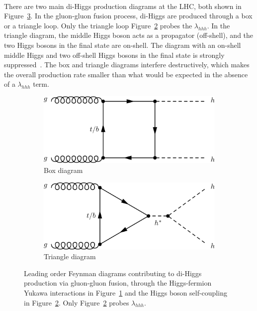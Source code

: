 \paragraph{}
There are two main di-Higgs production diagrams at the LHC, both shown in Figure~\ref{fig:SM_HH}. In the gluon-gluon  fusion process, di-Higgs are produced through a box or a triangle loop. 
Only the triangle loop Figure~\ref{fig:SM_HH_tri} probes the $\lambda_{hhh}$. 
In the triangle diagram, the middle Higgs boson acts as a propagator (off-shell), and the two Higgs bosons in the final state are on-shell. 
The diagram with an on-shell middle Higgs and two off-shell Higgs bosons in the final state is strongly suppressed~\cite{Pdg}.
The box and triangle diagrams interfere destructively, which makes the overall production rate smaller than what would be expected in the absence of a $\lambda_{hhh}$ term.

\begin{figure}[htbp!]
\centering
\captionsetup{justification=centering}
    \begin{subfigure}[b]{0.4\textwidth}
        \includegraphics[width=\textwidth]{figures/theory/SM_HH_box}
        \caption{Box diagram}
        \label{fig:SM_HH_box}
    \end{subfigure}
    \quad
    \begin{subfigure}[b]{0.4\textwidth}
        \includegraphics[width=\textwidth]{figures/theory/SM_HH_tri}
        \caption{Triangle diagram}
        \label{fig:SM_HH_tri}
    \end{subfigure}
\caption{Leading order Feynman diagrams contributing to di-Higgs production via gluon-gluon fusion, through the Higgs-fermion Yukawa interactions in Figure~\ref{fig:SM_HH_box} and the Higgs boson self-coupling in Figure~\ref{fig:SM_HH_tri}. Only Figure~\ref{fig:SM_HH_tri} probes $\lambda_{hhh}$.}
\label{fig:SM_HH}
\end{figure}

